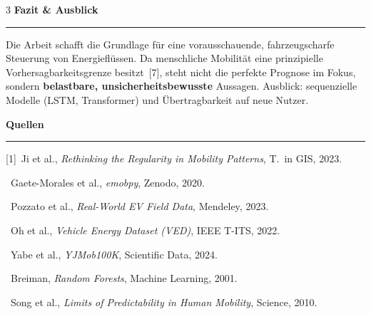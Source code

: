 \documentclass[10pt]{scrartcl}
\newcommand{\poster}[1]{%
  \vspace{0.10em}%
  {\color{heblue}\large\bfseries #1}\par\nobreak
  {\color{heblue}\rule{\linewidth}{1.2pt}}\par\nobreak\vspace{0.25em}}
\begin{document}
\begin{multicols}{3}
\poster{Fazit \& Ausblick}
Die Arbeit schafft die Grundlage für eine vorausschauende, fahrzeugscharfe Steuerung von Energieflüssen. Da menschliche Mobilität eine prinzipielle Vorhersagbarkeitsgrenze besitzt~[7], steht nicht die perfekte Prognose im Fokus, sondern \textbf{belastbare, unsicherheitsbewusste} Aussagen. Ausblick: sequenzielle Modelle (LSTM, Transformer) und \"Ubertragbarkeit auf neue Nutzer.

\poster{Quellen}
{\footnotesize\setlength{\parskip}{0.15em}
[1]~Ji et al., \emph{Rethinking the Regularity in Mobility Patterns}, T.\ in GIS, 2023.\par
[2]~Gaete-Morales et al., \emph{emobpy}, Zenodo, 2020.\par
[3]~Pozzato et al., \emph{Real-World EV Field Data}, Mendeley, 2023.\par
[4]~Oh et al., \emph{Vehicle Energy Dataset (VED)}, IEEE T-ITS, 2022.\par
[5]~Yabe et al., \emph{YJMob100K}, Scientific Data, 2024.\par
[6]~Breiman, \emph{Random Forests}, Machine Learning, 2001.\par
[7]~Song et al., \emph{Limits of Predictability in Human Mobility}, Science, 2010.\par}

\end{multicols}
\end{document}
